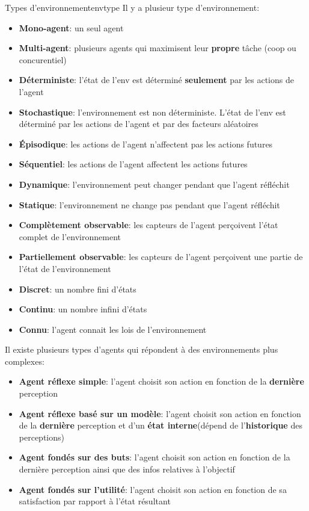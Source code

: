 \begin{definition}{Types d'environnement}{envtype}
    Il y a plusieur type d'environnement:

    \begin{itemize}
        \item \textbf{Mono-agent}: un seul agent
        \item \textbf{Multi-agent}: plusieurs agents qui maximisent leur \textbf{propre} tâche (coop ou concurentiel)
        \item \textbf{Déterministe}: l'état de l'env est déterminé \textbf{seulement} par les actions de l'agent
        \item \textbf{Stochastique}: l'environnement est non déterministe. L'état de l'env est déterminé par les actions de l'agent et par des facteurs aléatoires
        \item \textbf{Épisodique}: les actions de l'agent n'affectent pas les actions futures
        \item \textbf{Séquentiel}: les actions de l'agent affectent les actions futures
        \item \textbf{Dynamique}: l'environnement peut changer pendant que l'agent réfléchit
        \item \textbf{Statique}: l'environnement ne change pas pendant que l'agent réfléchit
        \item \textbf{Complètement observable}: les capteurs de l'agent perçoivent l'état complet de l'environnement
        \item \textbf{Partiellement observable}: les capteurs de l'agent perçoivent une partie de l'état de l'environnement
        \item \textbf{Discret}: un nombre fini d'états
        \item \textbf{Continu}: un nombre infini d'états
        \item \textbf{Connu}: l'agent connait les lois de l'environnement
    \end{itemize}
\end{definition}

Il existe plusieurs types d'agents qui répondent à des environnements plus complexes:
\begin{itemize}
    \item \textbf{Agent réflexe simple}: l'agent choisit son action en fonction de la \textbf{dernière} perception
    \item \textbf{Agent réflexe basé sur un modèle}: l'agent choisit son action en fonction de la \textbf{dernière} perception et d'un \textbf{état interne}(dépend de l'\textbf{historique} des perceptions) 
    \item \textbf{Agent fondés sur des buts}: l'agent choisit son action en fonction de la dernière perception 
        ainsi que des infos relatives à l'objectif
    \item \textbf{Agent fondés sur l'utilité}: l'agent choisit son action en fonction de 
        sa satisfaction par rapport à l'état résultant
\end{itemize}
